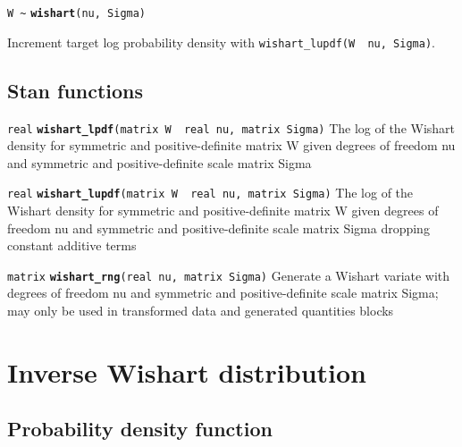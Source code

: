 \documentclass[
  10pt,
]{book}
\begin{document}
\texttt{W\ \textasciitilde{}} \textbf{\texttt{wishart}}\texttt{(nu,\ Sigma)}

Increment target log probability density with \texttt{wishart\_lupdf(W\ \textbar{}\ nu,\ Sigma)}.

\hypertarget{stan-functions-58}{%
\subsection{Stan functions}\label{stan-functions-58}}


\texttt{real} \textbf{\texttt{wishart\_lpdf}}\texttt{(matrix\ W\ \textbar{}\ real\ nu,\ matrix\ Sigma)}\newline
The log of the Wishart density for symmetric and positive-definite
matrix W given degrees of freedom nu and symmetric and
positive-definite scale matrix Sigma


\texttt{real} \textbf{\texttt{wishart\_lupdf}}\texttt{(matrix\ W\ \textbar{}\ real\ nu,\ matrix\ Sigma)}\newline
The log of the Wishart density for symmetric and positive-definite
matrix W given degrees of freedom nu and symmetric and
positive-definite scale matrix Sigma dropping constant additive terms


\texttt{matrix} \textbf{\texttt{wishart\_rng}}\texttt{(real\ nu,\ matrix\ Sigma)}\newline
Generate a Wishart variate with degrees of freedom nu and symmetric
and positive-definite scale matrix Sigma; may only be used in
transformed data and generated quantities blocks

\hypertarget{inverse-wishart-distribution}{%
\section{Inverse Wishart distribution}\label{inverse-wishart-distribution}}

\hypertarget{probability-density-function-35}{%
\subsection{Probability density function}\label{probability-density-function-35}}
\end{document}
